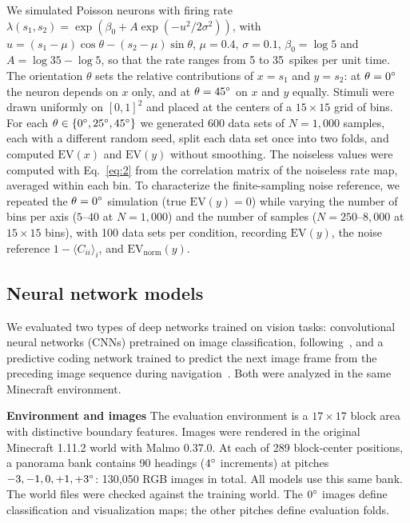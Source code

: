 \documentclass[11pt]{article}
\begin{document}
We simulated Poisson neurons with firing rate $\lambda(s_1, s_2) = \exp\!\left(\beta_0 + A\exp(-u^2/2\sigma^2)\right)$, with $u = (s_1 - \mu)\cos\theta - (s_2-\mu)\sin\theta$, $\mu=0.4$, $\sigma=0.1$, $\beta_0=\log 5$ and $A=\log 35-\log 5$, so that the rate ranges from 5 to 35~spikes per unit time. The orientation $\theta$ sets the relative contributions of $x=s_1$ and $y=s_2$: at $\theta=0\degree$ the neuron depends on $x$ only, and at $\theta=45\degree$ on $x$ and $y$ equally. Stimuli were drawn uniformly on $[0,1]^2$ and placed at the centers of a $15\times15$ grid of bins. For each $\theta \in \{0\degree, 25\degree, 45\degree\}$ we generated 600 data sets of $N = 1{,}000$ samples, each with a different random seed, split each data set once into two folds, and computed $\mathrm{EV}(x)$ and $\mathrm{EV}(y)$ without smoothing. The noiseless values were computed with Eq.~\ref{eq:2} from the correlation matrix of the noiseless rate map, averaged within each bin. To characterize the finite-sampling noise reference, we repeated the $\theta=0\degree$ simulation (true $\mathrm{EV}(y)=0$) while varying the number of bins per axis ($5$--$40$ at $N=1{,}000$) and the number of samples ($N=250$--$8{,}000$ at $15\times15$ bins), with 100 data sets per condition, recording $\mathrm{EV}(y)$, the noise reference $1-\langle C_{ii}\rangle_i$, and $\mathrm{EV}_{\mathrm{norm}}(y)$.

\subsection{Neural network models}

We evaluated two types of deep networks trained on vision tasks: convolutional neural networks (CNNs) pretrained on image classification, following~\cite{Luo2024}, and a predictive coding network trained to predict the next image frame from the preceding image sequence during navigation~\cite{Gornet2024automated}. Both were analyzed in the same Minecraft environment.

{\bf Environment and images}
The evaluation environment is a $17\times17$ block area with distinctive boundary features. Images were rendered in the original Minecraft 1.11.2 world with Malmo 0.37.0. At each of 289 block-center positions, a panorama bank contains 90 headings ($4\degree$ increments) at pitches $-3,-1,0,+1,+3\degree$: 130,050 RGB images in total. All models use this same bank. The world files were checked against the training world. The $0\degree$ images define classification and visualization maps; the other pitches define evaluation folds.
\end{document}
